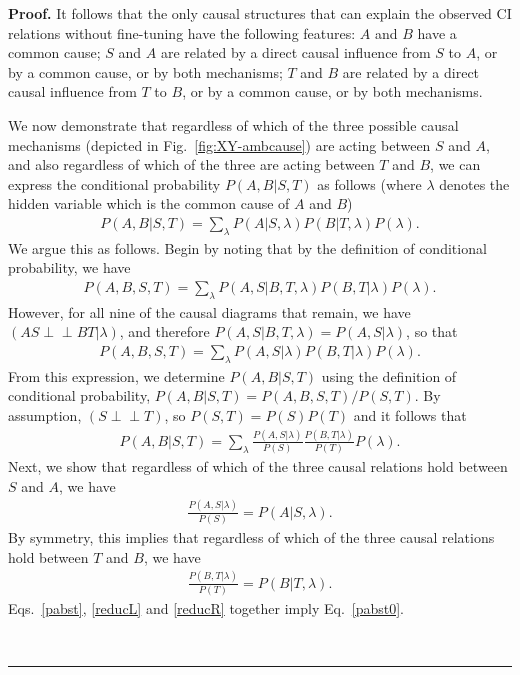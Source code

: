 \documentclass[12pt,onecolumn,nofootinbib]{revtex4-2}
\newenvironment{proof}[1][Proof]{\noindent\textbf{#1.} }{\ \rule{0.5em}{0.5em}}
\def\indep{\perp\!\!\!\!\perp}
\begin{document}
\begin{proof}
It follows that the only causal structures that can explain the observed CI relations without fine-tuning have the following features: $A$ and $B$ have a common cause;
$S$ and $A$ are related by a direct causal influence from $S$ to $A$, or by a common cause,
 or by both mechanisms; 
 $T$ and $B$ are related by a direct causal influence from $T$ to $B$, or by a common cause,
 or by both mechanisms. 

We now demonstrate that regardless of which of the three possible causal mechanisms (depicted in Fig.~\ref{fig:XY-ambcause}) are acting between $S$ and $A$, and also regardless of which of the three are acting between $T$ and $B$, we can express the conditional probability $P(A,B|S,T)$ as follows (where $\lambda$ denotes the hidden variable which is the common cause of $A$ and $B$)
\begin{eqnarray}\label{pabst0}
P(A,B|S,T) = \sum_{\lambda}  P(A|S,\lambda) P(B|T,\lambda) P(\lambda).
\end{eqnarray}
We argue this as follows.  Begin by noting that by the definition of conditional probability, we have
\begin{eqnarray}
P(A,B,S,T) = \sum_{\lambda} P(A,S|B,T, \lambda) P(B,T|\lambda) P(\lambda).
\end{eqnarray}
However, for all nine of the causal diagrams that remain, we have $\left(AS \indep BT | \lambda \right)$, and therefore $P(A,S|B,T, \lambda)=P(A,S|\lambda)$, so that 
\begin{eqnarray}
P(A,B,S,T) = \sum_{\lambda} P(A,S| \lambda) P(B,T|\lambda) P(\lambda).
\end{eqnarray}
From this expression, we determine $P(A,B|S,T)$ using the definition of conditional probability, $P(A,B|S,T)=P(A,B,S,T)/P(S,T)$.  By assumption, $\left(S \indep T\right)$, so $P(S,T)=P(S)P(T)$ and it follows that
\begin{eqnarray}\label{pabst}
P(A,B|S,T) = \sum_{\lambda}  \frac{ P(A,S| \lambda)}{P(S)}  \frac{ P(B,T| \lambda)}{P(T)}  P(\lambda).
\end{eqnarray}
Next, we show that regardless of which of the three causal relations hold between $S$ and $A$, we have
\begin{eqnarray}\label{reducL}
\frac{ P(A,S| \lambda)}{P(S)} = P(A|S,\lambda).
\end{eqnarray}
By symmetry, this implies that regardless of which of the three causal relations hold between $T$ and $B$, we have
\begin{eqnarray}\label{reducR}
\frac{ P(B,T| \lambda)}{P(T)} = P(B|T,\lambda).
\end{eqnarray}
Eqs.~\eqref{pabst}, \eqref{reducL} and \eqref{reducR} together imply Eq.~\eqref{pabst0}.


\end{proof}
\end{document}
